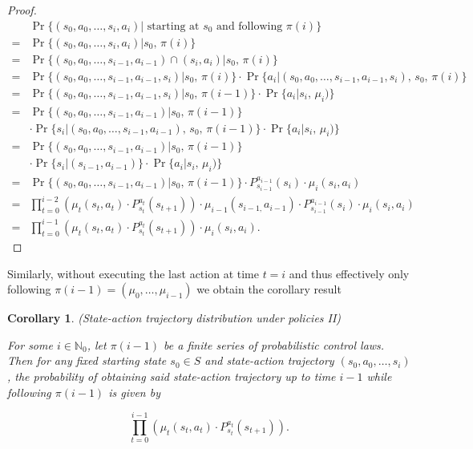\documentclass[11pt]{article} %
\newtheorem{cor}{Corollary}
\begin{document}
\begin{proof}
\begin{equation}\label{controlLawTrajIS}
	\begin{array}{ll}
			& \Pr\{(s_0,a_0,\dots, s_i, a_i) | \text{ starting at } s_0 \text{ and following } \pi(i)\} \\
		=	& \Pr\{(s_0,a_0,\dots, s_i, a_i) | s_0, \, \pi(i)\} \\
		=	& \Pr\{(s_0,a_0,\dots, s_{i-1}, a_{i-1}) \cap (s_i,a_i) | s_0, \, \pi(i)\} \\
		=	& \Pr\{(s_0,a_0,\dots, s_{i-1}, a_{i-1},s_i) | s_0, \, \pi(i)\} \cdot \Pr\{a_i |(s_0,a_0,\dots, s_{i-1}, a_{i-1},s_i), \, s_0, \, \pi(i)\} \\
		=	& \Pr\{(s_0,a_0,\dots, s_{i-1}, a_{i-1},s_i) | s_0, \, \pi(i-1)\} \cdot \Pr\{a_i | s_i, \, \mu_i)\} \\
		=	& \Pr\{(s_0,a_0,\dots, s_{i-1}, a_{i-1}) | s_0, \, \pi(i-1)\} \\
			& \cdot \Pr\{s_i | (s_0,a_0,\dots, s_{i-1}, a_{i-1}), \, s_0, \, \pi(i-1) \} \cdot \Pr\{a_i | s_i, \, \mu_i)\} \\
		=	& \Pr\{(s_0,a_0,\dots, s_{i-1}, a_{i-1}) | s_0, \, \pi(i-1)\} \\
			& \cdot \Pr\{s_i | (s_{i-1}, a_{i-1}) \} \cdot \Pr\{a_i | s_i, \, \mu_i)\} \\
		=	& \Pr\{(s_0,a_0,\dots, s_{i-1}, a_{i-1}) | s_0, \, \pi(i-1)\} \cdot P^{a_{i-1}}_{s_{i-1}}(s_i) \cdot \mu_i(s_i,a_i) \\
		=	& \prod_{t=0}^{i-2} \left( \mu_t(s_t,a_t) \cdot P^{a_t}_{s_t}(s_{t+1}) \right) \cdot \mu_{i-1}(s_{i-1,}a_{i-1}) \cdot P^{a_{i-1}}_{s_{i-1}}(s_i) \cdot \mu_i(s_i,a_i) \\		
		=	& \prod_{t=0}^{i-1} \left( \mu_t(s_t,a_t) \cdot P^{a_t}_{s_t}(s_{t+1}) \right) \cdot \mu_i(s_i,a_i).
	\end{array}
\end{equation}

\end{proof}

Similarly, without executing the last action at time $t = i$ and thus effectively only following $\pi(i-1) = (\mu_0,\dots,\mu_{i-1})$ we obtain the corollary result

\begin{cor}(State-action trajectory distribution under policies II)\label{corStateActionControlLawTrajProb1}

For some $i \in \mathbb{N}_0$, let $\pi(i-1)$ be a finite series of probabilistic control laws. Then for any fixed starting state $s_0 \in S$ and state-action trajectory $(s_0,a_0,\dots,s_i)$, the probability of obtaining said state-action trajectory up to time $i-1$ while following $\pi(i-1)$ is given by

\begin{equation}\label{stateActionControlLawTrajProb2}
	\prod_{t=0}^{i-1} \left( \mu_t(s_t,a_t) \cdot P^{a_t}_{s_t}(s_{t+1}) \right).
\end{equation}

\end{cor}
\end{document}
